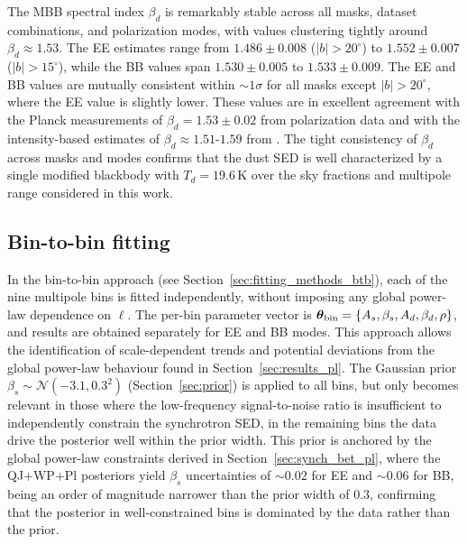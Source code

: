The MBB spectral index $\beta_d$ is remarkably stable across all masks, dataset combinations, and polarization modes, with values clustering tightly around $\beta_d \approx 1.53$. The EE estimates range from $1.486 \pm 0.008$ ($|b| > 20^\circ$) to $1.552 \pm 0.007$ ($|b| > 15^\circ$), while the BB values span $1.530 \pm 0.005$ to $1.533 \pm 0.009$. The EE and BB values are mutually consistent within $\sim 1\sigma$ for all masks except $|b| > 20^\circ$, where the EE value is slightly lower. These values are in excellent agreement with the Planck measurements of $\beta_d = 1.53 \pm 0.02$ from polarization data \citep{Planck_2018XI} and with the intensity-based estimates of $\beta_d \approx 1.51$-$1.59$ from \citet{Planck_XXII}. The tight consistency of $\beta_d$ across masks and modes confirms that the dust SED is well characterized by a single modified blackbody with $T_d = 19.6\,\mathrm{K}$ over the sky fractions and multipole range considered in this work.



% 
% 
% 



\subsection{Bin-to-bin fitting}
\label{sec:results_btb}

In the bin-to-bin approach (see Section~\ref{sec:fitting_methods_btb}), each of the nine multipole bins is fitted independently, without imposing any global power-law dependence on $\ell$. The per-bin parameter vector is $\boldsymbol{\theta}_{\rm bin} = \{A_s, \beta_s, A_d, \beta_d, \rho\}$, and results are obtained separately for EE and BB modes. This approach allows the identification of scale-dependent trends and potential deviations from the global power-law behaviour found in Section~\ref{sec:results_pl}. The Gaussian prior $\beta_s \sim \mathcal{N}(-3.1, 0.3^2)$ (Section~\ref{sec:prior}) is applied to all bins, but only becomes relevant in those where the low-frequency signal-to-noise ratio is insufficient to independently constrain the synchrotron SED, in the remaining bins the data drive the posterior well within the prior width. This prior is anchored by the global power-law constraints derived in Section~\ref{sec:synch_bet_pl}, where the QJ+WP+Pl posteriors yield $\beta_s$ uncertainties of $\sim 0.02$ for EE and $\sim 0.06$ for BB, being an order of magnitude narrower than the prior width of $0.3$, confirming that the posterior in well-constrained bins is dominated by the data rather than the prior.

